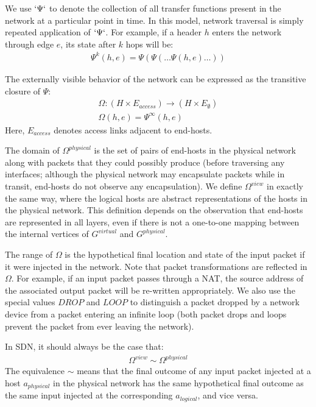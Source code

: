 We use $`\Psi`$ to denote the collection of all transfer functions present in
the network at a particular point in time. In this model, network traversal is
simply repeated application of $`\Psi`$.
For example, if a header $h$ enters the network through edge
$e$, its state after $k$ hops will be:
\begin{align*}
\Psi^k(h,e) = \Psi(\Psi(\dots \Psi(h,e)\dots))
\end{align*}

The externally visible behavior of the network can be expressed as the
transitive closure of $\Psi$:
\begin{align*}
\Omega: (H \times E_{access}) \rightarrow (H \times E_{\emptyset}) \\
\Omega(h,e) = \Psi^{\infty}(h,e)
\end{align*}
Here, $E_{access}$ denotes access links adjacent to end-hosts.

The domain of $\Omega^{physical}$ is the set of pairs of end-hosts in the
physical network along with packets that they could possibly produce (before
traversing any interfaces; although the physical network may encapsulate
packets while in transit, end-hosts do not observe any encapsulation).
We define $\Omega^{view}$ in exactly the same way, where
the logical hosts are abstract representations of the hosts in the physical
network. This definition depends on the observation that end-hosts are represented
in all layers, even if there is not a one-to-one mapping between the
internal vertices of $G^{virtual}$ and $G^{physical}$.

The range of $\Omega$ is the hypothetical final location and state of the
input packet if it were injected in the network.
Note that packet transformations are reflected in
$\Omega$. For example, if an input packet passes through a NAT,
the source address of the associated output packet will be re-written
appropriately. We also use the special values $DROP$ and $LOOP$ to distinguish
a packet dropped by a network device from a packet entering an
infinite loop (both packet drops and loops prevent the packet from ever leaving the network).

In SDN, it should always be the case that:
\begin{align*}
\Omega^{view} \sim \Omega^{physical}
\end{align*}
The equivalence $\sim$ means that the final outcome of any input packet
injected at a host $a_{physical}$ in the physical network has the same hypothetical final outcome as
the same input injected at the corresponding $a_{logical}$, and vice versa.

